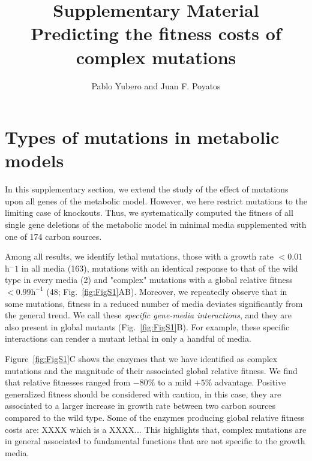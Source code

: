 \documentclass{article}
\begin{document}
\title{Supplementary Material \\ Predicting the fitness costs of complex mutations}
\author{Pablo Yubero and Juan F. Poyatos}

\maketitle

\tableofcontents
\newpage


\section{Types of mutations in metabolic models}


In this supplementary section, we extend the study of the effect of mutations upon all genes of the metabolic model. However, we here restrict mutations to the limiting case of knockouts. Thus, we systematically computed the fitness of all single gene deletions of the metabolic model in minimal media supplemented with one of 174 carbon sources.

Among all results, we identify lethal mutations, those with a growth rate $<0.01$ h$^-1$ in all media (163), mutations with an identical response to that of the wild type in every media (2) and "complex" mutations with a global relative fitness $<0.99 \text{h}^{-1}$ (48; Fig.~\ref{fig:FigS1}AB). Moreover, we repeatedly observe that in some mutations, fitness in a reduced number of media deviates significantly from the general trend. We call these {\it specific gene-media interactions}, and they are also present in global mutants (Fig.~\ref{fig:FigS1}B). For example, these specific interactions can render a mutant lethal in only a handful of media. 

Figure~\ref{fig:FigS1}C shows the enzymes that we have identified as complex mutations and the magnitude of their associated global relative fitness. We find that relative fitnesses ranged from $-80\%$ to a mild $+5\%$ advantage. Positive generalized fitness should be considered with caution, in this case, they are associated to a larger increase in growth rate between two carbon sources compared to the wild type. Some of the enzymes producing global relative fitness costs are: XXXX which is a XXXX... This highlights that, complex mutations are in general associated to fundamental functions that are not specific to the growth media.
\end{document}
